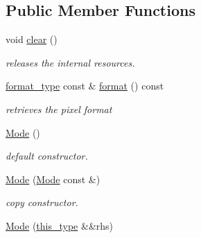 \subsection*{Public Member Functions}
\begin{DoxyCompactItemize}
\item 
\hypertarget{classhryky_1_1display_1_1_mode_a7645a712ff9359ad2eaa5db9824dfa98}{void \hyperlink{classhryky_1_1display_1_1_mode_a7645a712ff9359ad2eaa5db9824dfa98}{clear} ()}\label{classhryky_1_1display_1_1_mode_a7645a712ff9359ad2eaa5db9824dfa98}

\begin{DoxyCompactList}\small\item\em releases the internal resources. \end{DoxyCompactList}\item 
\hypertarget{classhryky_1_1display_1_1_mode_a17b84e905579d33e25f8946eb67ca2a9}{\hyperlink{namespacehryky_1_1display_a8b77ffd7407c2f861e6c4872a2444330}{format\-\_\-type} const \& \hyperlink{classhryky_1_1display_1_1_mode_a17b84e905579d33e25f8946eb67ca2a9}{format} () const }\label{classhryky_1_1display_1_1_mode_a17b84e905579d33e25f8946eb67ca2a9}

\begin{DoxyCompactList}\small\item\em retrieves the pixel format \end{DoxyCompactList}\item 
\hypertarget{classhryky_1_1display_1_1_mode_a0ea5d1bb08e8ea3e8c3b0f29d8c3d038}{\hyperlink{classhryky_1_1display_1_1_mode_a0ea5d1bb08e8ea3e8c3b0f29d8c3d038}{Mode} ()}\label{classhryky_1_1display_1_1_mode_a0ea5d1bb08e8ea3e8c3b0f29d8c3d038}

\begin{DoxyCompactList}\small\item\em default constructor. \end{DoxyCompactList}\item 
\hypertarget{classhryky_1_1display_1_1_mode_a02b87131cabc4482d0f229a30fb1b3d2}{\hyperlink{classhryky_1_1display_1_1_mode_a02b87131cabc4482d0f229a30fb1b3d2}{Mode} (\hyperlink{classhryky_1_1display_1_1_mode}{Mode} const \&)}\label{classhryky_1_1display_1_1_mode_a02b87131cabc4482d0f229a30fb1b3d2}

\begin{DoxyCompactList}\small\item\em copy constructor. \end{DoxyCompactList}\item 
\hypertarget{classhryky_1_1display_1_1_mode_a63aec9fb592ee41e0779e561bbc96f01}{\hyperlink{classhryky_1_1display_1_1_mode_a63aec9fb592ee41e0779e561bbc96f01}{Mode} (\hyperlink{classhryky_1_1display_1_1_mode_a0c68f6c39098781552942da1586968bc}{this\-\_\-type} \&\&rhs)}\label{classhryky_1_1display_1_1_mode_a63aec9fb592ee41e0779e561bbc96f01}


\end{DoxyCompactItemize}
